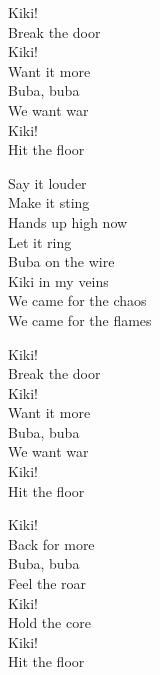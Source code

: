 \begin{lyrics}
Kiki!\\
Break the door\\
Kiki!\\
Want it more\\
Buba, buba\\
We want war\\
Kiki!\\
Hit the floor

Say it louder\\
Make it sting\\
Hands up high now\\
Let it ring\\
Buba on the wire\\
Kiki in my veins\\
We came for the chaos\\
We came for the flames

Kiki!\\
Break the door\\
Kiki!\\
Want it more\\
Buba, buba\\
We want war\\
Kiki!\\
Hit the floor

Kiki!\\
Back for more\\
Buba, buba\\
Feel the roar\\
Kiki!\\
Hold the core\\
Kiki!\\
Hit the floor
\end{lyrics}

